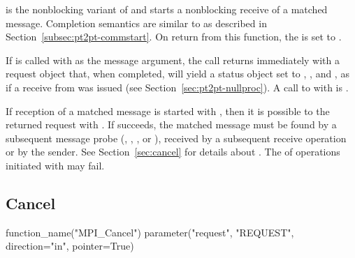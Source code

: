  is the nonblocking variant of 
and starts a nonblocking receive of a matched message. Completion
semantics are similar to  as described in
Section~\ref{subsec:pt2pt-commstart}. On return from this function,
the  is set to .

If  is called with 
as the message argument, the call returns immediately with a request
object that, when completed, will yield a status object set to
\mpicode{ = }, \mpicode{ = },
and , as if a receive from 
was issued (see Section~\ref{sec:pt2pt-nullproc}).
A call to  with  is .

\begin{implementors}
If reception of a matched message is started with
, then it is possible to  the returned
request with . If  succeeds, the
matched message must be found by a subsequent message probe
(, , , or
), received by a subsequent receive operation or
 by the sender.
See Section~\ref{sec:cancel} for details about .
The  of operations initiated with  may
fail.
\end{implementors}

\subsection{Cancel}
\label{sec:cancel}

\begin{mpi-binding}
    function_name("MPI_Cancel")
    parameter("request", "REQUEST", direction="in", pointer=True)
\end{mpi-binding}

